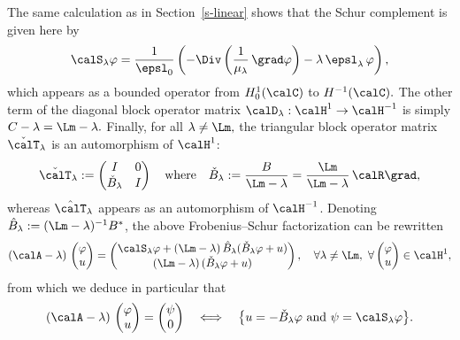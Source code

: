 The same calculation as in Section~\ref{s-linear} shows that the Schur complement is given here by
\begin{equation}\label{e.def-calS}
\calS_\lambda \varphi = \frac{1}{\epsl_0} \left(-\Div \left(\frac{1}{\mu_\lambda}\, \grad\varphi \right) - \lambda\,\epsl_\lambda\, \varphi\right),
\end{equation}
which appears as a bounded operator from $H^1_0(\calC)$ to $H^{-1}(\calC).$ The other term of the diagonal block operator matrix $\calD_\lambda: \calH^{1} \to \calH^{-1}$ is simply $C-\lambda = \Lm - \lambda.$ Finally, for all $\lambda \neq \Lm,$ the triangular block operator matrix $\check{\calT}_\lambda$ is an automorphism of $\calH^{1}$:
\[
\check{\calT}_\lambda :=
\begin{pmatrix} I & 0 \\ \check{B}_\lambda & I
\end{pmatrix}
\quad\text{where}\quad
\check{B}_\lambda := \frac{B}{\Lm -\lambda} = \frac{\Lm}{\Lm -\lambda}\,\calR\grad,
\]
whereas $\hat{\calT}_\lambda$ appears as an automorphism of $\calH^{-1}$. Denoting $\hat{B}_\lambda := (\Lm-\lambda)^{-1} B^*$, the above Frobenius--Schur factorization can be rewritten
\begin{equation}\label{e.Frob-Schur}
(\calA - \lambda) \,
\begin{pmatrix} \varphi \\ u
\end{pmatrix}
=
\begin{pmatrix} \calS_\lambda \varphi + (\Lm - \lambda)\, \hat{B}_\lambda(\check{B}_\lambda \varphi + u) \\
(\Lm - \lambda)\, (\check{B}_\lambda \varphi + u)
\end{pmatrix},
\quad \forall \lambda \neq \Lm, \ \forall
\begin{pmatrix} \varphi \\ u
\end{pmatrix} \in \calH^1,
\end{equation}
from which we deduce in particular that
\begin{equation}\label{e.Frob-Schur-reduit}
(\calA - \lambda) \,
\begin{pmatrix} \varphi \\ u
\end{pmatrix}
=
\begin{pmatrix} \psi \\ 0
\end{pmatrix}
\quad\Longleftrightarrow\quad
\big\{ u = -\check{B}_\lambda \varphi \text{ and } \psi = \calS_\lambda \varphi \big\}.
\end{equation}

